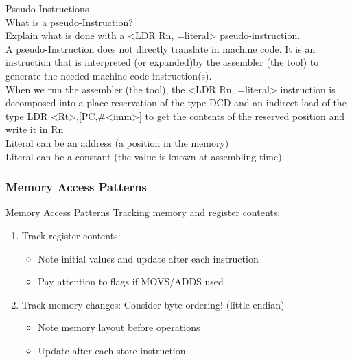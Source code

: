 \begin{example2}{Pseudo-Instructions}\\
What is a pseudo-Instruction? \\Explain what is done with a <LDR Rn, =literal> pseudo-instruction.
\vspace{2mm}\\
A pseudo-Instruction does not directly translate in machine code. It is an instruction that is interpreted (or expanded)by the assembler (the tool) to generate the needed machine code instruction(s).
\vspace{2mm}\\
When we run the assembler (the tool), the <LDR Rn, =literal> instruction is decomposed into a place reservation of the type DCD and an indirect load of the type LDR <Rt>,[PC,\#<imm>] to get the contents of the reserved position and write it in Rn
\vspace{2mm}\\
Literal can be an address (a position in the memory)\\
Literal can be a constant (the value is known at assembling time)
\end{example2}

\raggedcolumns
\columnbreak

\subsubsection{Memory Access Patterns}

\begin{theorem}{Memory Access Patterns}
Tracking memory and register contents:
\begin{enumerate}
  \item Track register contents:
    \begin{itemize}
      \item Note initial values and update after each instruction
      \item Pay attention to flags if MOVS/ADDS used
    \end{itemize}
  \item Track memory changes: Consider byte ordering! (little-endian)
    \begin{itemize}
      \item Note memory layout before operations
      \item Update after each store instruction
    \end{itemize}
\end{enumerate}
\end{theorem}

